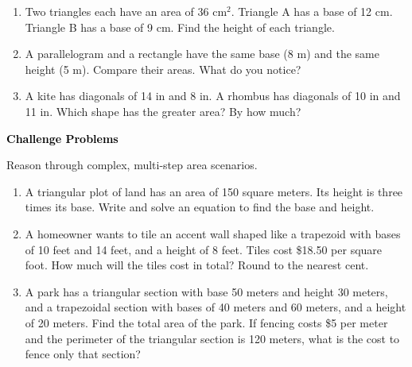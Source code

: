 \documentclass[12pt, letterpaper, fleqn]{article}
\begin{document}
\begin{enumerate}[itemsep=2.3cm, leftmargin=0.6cm]

\item Two triangles each have an area of 36 cm$^2$. Triangle A has a base of 12 cm. Triangle B has a base of 9 cm. Find the height of each triangle.

\vspace{2.2cm}

\item A parallelogram and a rectangle have the same base (8 m) and the same height (5 m). Compare their areas. What do you notice?

\vspace{2.2cm}

\item A kite has diagonals of 14 in and 8 in. A rhombus has diagonals of 10 in and 11 in. Which shape has the greater area? By how much?

\vspace{2.5cm}

\end{enumerate}

\newpage

\begin{tcolorbox}[colback=black!10]
\large\textcolor{black}{\textbf{Challenge Problems}}
\end{tcolorbox}

\noindent
Reason through complex, multi-step area scenarios.

\vspace{3mm}

\begin{enumerate}[itemsep=2.4cm, leftmargin=0.6cm]

\item A triangular plot of land has an area of 150 square meters. Its height is three times its base. Write and solve an equation to find the base and height.

\vspace{2.3cm}

\item A homeowner wants to tile an accent wall shaped like a trapezoid with bases of 10 feet and 14 feet, and a height of 8 feet. Tiles cost \$18.50 per square foot. How much will the tiles cost in total? Round to the nearest cent.

\vspace{2.3cm}

\item A park has a triangular section with base 50 meters and height 30 meters, and a trapezoidal section with bases of 40 meters and 60 meters, and a height of 20 meters. Find the total area of the park. If fencing costs \$5 per meter and the perimeter of the triangular section is 120 meters, what is the cost to fence only that section?

\vspace{2.5cm}

\end{enumerate}
\end{document}
